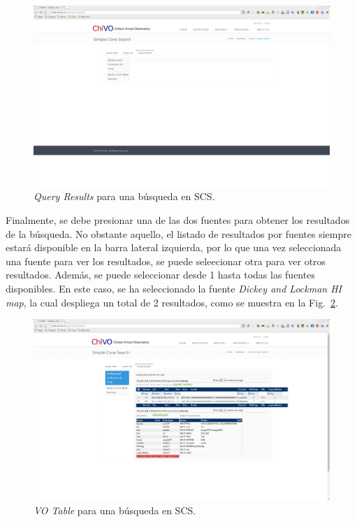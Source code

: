 \begin{figure}[ht!]
    \begin{center}
	\includegraphics[scale=.2]{img/qrscs}
    \end{center}
    \caption{\emph{Query Results} para una búsqueda en SCS.}
    \label{img:qrscs}
\end{figure}

Finalmente, se debe presionar una de las dos fuentes para obtener los
resultados de la búsqueda. No obstante aquello, el listado de
resultados por fuentes siempre estará disponible en la barra lateral
izquierda, por lo que una vez seleccionada una fuente para ver los
resultados, se puede seleecionar otra para ver otros resultados.
Además, se puede seleccionar desde 1 hasta todas las fuentes
disponibles. En este caso, se ha seleccionado la fuente \emph{Dickey
and Lockman HI map}, la cual despliega un total de 2 resultados,
como se muestra en la Fig.~\ref{img:qrscsvot}.

\begin{figure}[ht!]
    \begin{center}
	\includegraphics[scale=.2]{img/qrscsvot}
    \end{center}
    \caption{\emph{VO Table} para una búsqueda en SCS.}
    \label{img:qrscsvot}
\end{figure}



